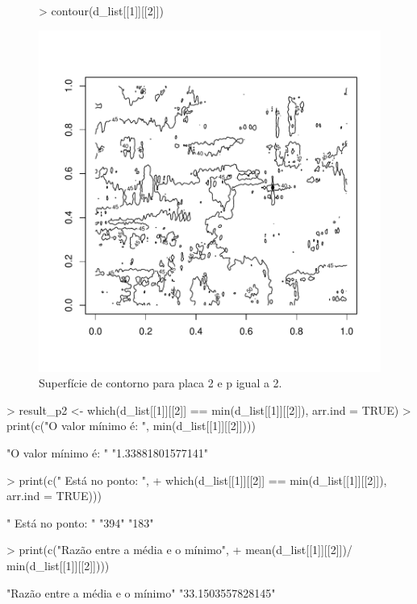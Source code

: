 \documentclass[12pt]{article}
\begin{document}
\begin{figure}
 \centering
\begin{Schunk}
\begin{Sinput}
>  contour(d_list[[1]][[2]])
\end{Sinput}
\end{Schunk}
\includegraphics{template_matching-020}
 \caption{Superfície de contorno para placa 2 e p igual a 2.}
 \label{placa1p2}
\end{figure}
\begin{Schunk}
\begin{Sinput}
>  result_p2 <- which(d_list[[1]][[2]] == min(d_list[[1]][[2]]), arr.ind = TRUE)
>  print(c("O valor mínimo é: ",  min(d_list[[1]][[2]])))
\end{Sinput}
\begin{Soutput}
[1] "O valor mínimo é: " "1.33881801577141"  
\end{Soutput}
\begin{Sinput}
>  print(c(" Está no ponto: ",
+          which(d_list[[1]][[2]] == min(d_list[[1]][[2]]), arr.ind = TRUE)))
\end{Sinput}
\begin{Soutput}
[1] " Está no ponto: " "394"              "183"             
\end{Soutput}
\begin{Sinput}
>  print(c("Razão entre a média e o mínimo", 
+         mean(d_list[[1]][[2]])/ min(d_list[[1]][[2]])))
\end{Sinput}
\begin{Soutput}
[1] "Razão entre a média e o mínimo" "33.1503557828145"              
\end{Soutput}
\end{Schunk}
\end{document}
